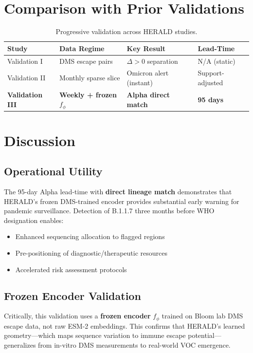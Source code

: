 \documentclass[11pt]{article}
\begin{document}
\section{Comparison with Prior Validations}
\begin{table}[H]
\centering
\caption{Progressive validation across HERALD studies.}
\label{tab:comparison}
\begin{tabular}{llll}
\toprule
\textbf{Study} & \textbf{Data Regime} & \textbf{Key Result} & \textbf{Lead-Time} \\
\midrule
Validation I & DMS escape pairs & $\Delta > 0$ separation & N/A (static) \\
Validation II & Monthly sparse slice & Omicron alert (instant) & Support-adjusted \\
\textbf{Validation III} & \textbf{Weekly + frozen $f_{\phi}$} & \textbf{Alpha direct match} & \textbf{95 days} \\
\bottomrule
\end{tabular}
\end{table}

\section{Discussion}
\subsection{Operational Utility}
The 95-day Alpha lead-time with \textbf{direct lineage match} demonstrates that HERALD's frozen DMS-trained encoder provides substantial early warning for pandemic surveillance. Detection of B.1.1.7 three months before WHO designation enables:
\begin{itemize}[leftmargin=1.1em]
  \item Enhanced sequencing allocation to flagged regions
  \item Pre-positioning of diagnostic/therapeutic resources
  \item Accelerated risk assessment protocols
\end{itemize}

\subsection{Frozen Encoder Validation}
Critically, this validation uses a \textbf{frozen encoder} $f_{\phi}$ trained on Bloom lab DMS escape data, not raw ESM-2 embeddings. This confirms that HERALD's learned geometry---which maps sequence variation to immune escape potential---generalizes from in-vitro DMS measurements to real-world VOC emergence.
\end{document}
